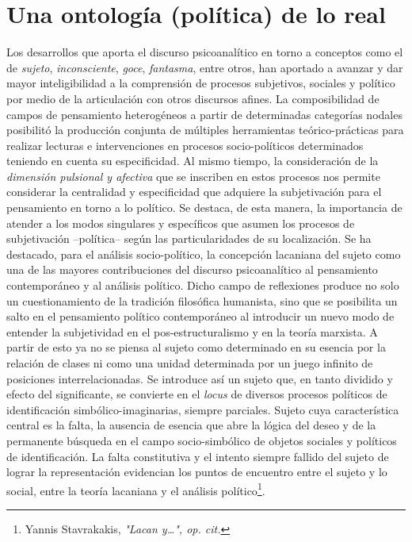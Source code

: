 \documentclass{book}
\begin{document}
\section{Una ontología (política) de lo real}

Los desarrollos que aporta el discurso psicoanalítico en torno a
conceptos como el de \emph{sujeto}, \emph{inconsciente}, \emph{goce},
\emph{fantasma}, entre otros, han aportado a avanzar y dar mayor
inteligibilidad a la comprensión de procesos subjetivos, sociales y
político por medio de la articulación con otros discursos afines. La
composibilidad de campos de pensamiento heterogéneos a partir de
determinadas categorías nodales posibilitó la producción conjunta de
múltiples herramientas teórico-prácticas para realizar lecturas e
intervenciones en procesos socio-políticos determinados teniendo en
cuenta su especificidad. Al mismo tiempo, la consideración de la
\emph{dimensión pulsional y afectiva} que se inscriben en estos procesos
nos permite considerar la centralidad y especificidad que adquiere la
subjetivación para el pensamiento en torno a lo político. Se destaca, de
esta manera, la importancia de atender a los modos singulares y
específicos que asumen los procesos de subjetivación --política-- según
las particularidades de su localización. Se ha destacado, para el
análisis socio-político, la concepción lacaniana del sujeto como una de
las mayores contribuciones del discurso psicoanalítico al pensamiento
contemporáneo y al análisis político. Dicho campo de reflexiones produce
no solo un cuestionamiento de la tradición filosófica humanista, sino
que se posibilita un salto en el pensamiento político contemporáneo al
introducir un nuevo modo de entender la subjetividad en el
pos-estructuralismo y en la teoría marxista. A partir de esto ya no se
piensa al sujeto como determinado en su esencia por la relación de
clases ni como una unidad determinada por un juego infinito de
posiciones interrelacionadas. Se introduce así un sujeto que, en tanto
dividido y efecto del significante, se convierte en el \emph{locus} de
diversos procesos políticos de identificación simbólico-imaginarias,
siempre parciales. Sujeto cuya característica central es la falta, la
ausencia de esencia que abre la lógica del deseo y de la permanente
búsqueda en el campo socio-simbólico de objetos sociales y políticos de
identificación. La falta constitutiva y el intento siempre fallido del
sujeto de lograr la representación evidencian los puntos de encuentro
entre el sujeto y lo social, entre la teoría lacaniana y el análisis
político\footnote{Yannis Stavrakakis, \emph{"Lacan y\ldots", op. cit.}}.
\end{document}
